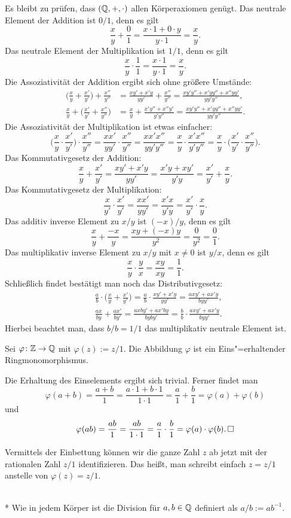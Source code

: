 \begin{Beweis}
Es bleibt zu prüfen, dass $(\mathbb Q,+,\cdot)$ allen Körperaxiomen genügt.
Das neutrale Element der Addition ist $0/1$, denn es gilt
\[\frac{x}{y}+\frac{0}{1} = \frac{x\cdot 1+0\cdot y}{y\cdot 1} = \frac{x}{y}.\]
Das neutrale Element der Multiplikation ist $1/1$, denn es gilt
\[\frac{x}{y}\cdot\frac{1}{1} = \frac{x\cdot 1}{y\cdot 1} = \frac{x}{y}.\]
Die Assoziativität der Addition ergibt sich ohne größere Umstände:
\begin{align*}
\bigg(\frac{x}{y}+\frac{x'}{y'}\bigg)+\frac{x''}{y''}
&= \frac{xy'+x'y}{yy'} + \frac{x''}{y''}
= \frac{xy'y''+x'yy''+x''yy'}{yy'y''},\\
\frac{x}{y}+\bigg(\frac{x'}{y'}+\frac{x''}{y''}\bigg)
&= \frac{x}{y}+\frac{x'y''+x''y'}{y'y''}
= \frac{xy'y''+x'yy''+x''yy'}{yy'y''}.
\end{align*}
Die Assoziativität der Multiplikation ist etwas einfacher:
\[\bigg(\frac{x}{y}\cdot\frac{x'}{y'}\bigg)\cdot\frac{x''}{y''}
= \frac{xx'}{yy'}\cdot\frac{x''}{y''} = \frac{xx'x''}{yy'y''}
= \frac{x}{y}\cdot\frac{x'x''}{y'y''}
= \frac{x}{y}\cdot\bigg(\frac{x'}{y'}\cdot\frac{x''}{y''}\bigg).\]
Das Kommutativgesetz der Addition:
\[\frac{x}{y}+\frac{x'}{y'} = \frac{xy'+x'y}{yy'}
= \frac{x'y+xy'}{y'y}
= \frac{x'}{y'}+\frac{x}{y}.\]
Das Kommutativgesetz der Multiplikation:
\[\frac{x}{y'}\cdot\frac{x'}{y'}
= \frac{xx'}{yy'} = \frac{x'x}{y'y}
= \frac{x'}{y'}\cdot\frac{x}{y}.\]
Das additiv inverse Element zu $x/y$ ist $(-x)/y$, denn es gilt
\[\frac{x}{y}+\frac{-x}{y} = \frac{xy+(-x)y}{y^2}
= \frac{0}{y^2} = \frac{0}{1}.\]
Das multiplikativ inverse Element zu $x/y$ mit $x\ne 0$
ist $y/x$, denn es gilt
\[\frac{x}{y}\cdot\frac{y}{x} = \frac{xy}{xy} = \frac{1}{1}.\]
Schließlich findet bestätigt man noch das Distributivgesetz:
\begin{align*}
&\frac{a}{b}\cdot\bigg(\frac{x}{y}+\frac{x'}{y'}\bigg)
= \frac{a}{b}\cdot\frac{xy'+x'y}{yy'}
= \frac{axy'+ax'y}{byy'},\\
&\frac{ax}{by}+\frac{ax'}{by'}
= \frac{axby'+ax'by}{byby'}
= \frac{b}{b}\cdot\frac{axy'+ax'y}{byy'}.
\end{align*}
Hierbei beachtet man, dass $b/b=1/1$ das multiplikativ
neutrale Element ist.\,\qedsymbol
\end{Beweis}

\newpage
\begin{Satz}\newlinefirst
Sei $\varphi\colon\mathbb Z\to\mathbb Q$ mit $\varphi(z):=z/1$. Die
Abbildung $\varphi$ ist ein Eins"=erhaltender Ringmonomorphismus.
\end{Satz}
\begin{Beweis}
Die Erhaltung des Einselements ergibt sich
trivial. Ferner findet man
\[\varphi(a+b) = \frac{a+b}{1} = \frac{a\cdot 1+b\cdot 1}{1\cdot 1}
= \frac{a}{1}+\frac{b}{1} = \varphi(a)+\varphi(b)\]
und
\[\varphi(ab) = \frac{ab}{1} = \frac{ab}{1\cdot 1} = \frac{a}{1}\cdot\frac{b}{1}
= \varphi(a)\cdot\varphi(b).\,\square\]
\end{Beweis}
Vermittels der Einbettung können wir die ganze Zahl $z$ ab jetzt
mit der rationalen Zahl $z/1$ identifizieren. Das heißt, man schreibt
einfach $z=z/1$ anstelle von $\varphi(z)=z/1$.

\begin{Definition}\mbox{}\\*
Wie in jedem Körper ist die Division für $a,b\in\mathbb Q$
definiert als $a/b := ab^{-1}$.
\end{Definition}

